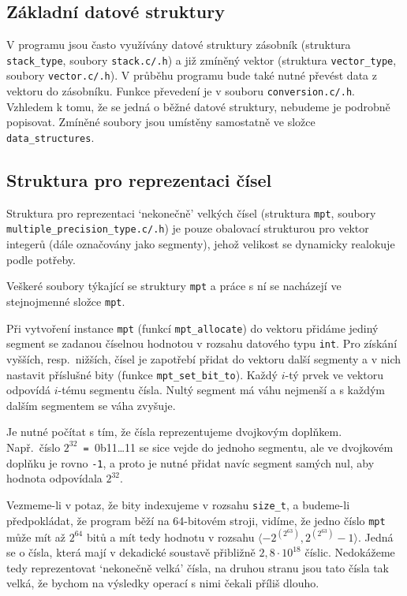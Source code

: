 \subsection{Základní datové struktury}
V programu jsou často využívány datové struktury zásobník (struktura \verb|stack_type|, soubory \verb|stack.c/.h|) a již zmíněný vektor (struktura \verb|vector_type|, soubory \verb|vector.c/.h|).
V průběhu programu bude také nutné převést data z vektoru do zásobníku. Funkce převedení je v souboru \verb|conversion.c/.h|. Vzhledem k tomu, že se jedná o běžné datové struktury, nebudeme je podrobně popisovat. Zmíněné soubory jsou umístěny samostatně ve složce \verb|data_structures|. 

\subsection{Struktura pro reprezentaci čísel}\label{subsection:mpt}
Struktura pro reprezentaci `nekonečně' velkých čísel (struktura \verb|mpt|, soubory \\ \verb|multiple_precision_type.c/.h|) je pouze obalovací strukturou pro vektor integerů (dále označovány jako segmenty), jehož velikost se dynamicky realokuje podle potřeby.

Veškeré soubory týkající se struktury \verb|mpt| a práce s ní se nacházejí ve stejnojmenné složce \verb|mpt|.

Při vytvoření instance \verb|mpt| (funkcí \verb|mpt_allocate|) do vektoru přidáme jediný segment se zadanou číselnou hodnotou v rozsahu datového typu \verb|int|. Pro získání vyšších, resp.~nižších, čísel je zapotřebí přidat do vektoru další segmenty a v nich nastavit příslušné bity (funkce \verb|mpt_set_bit_to|). Každý $i$-tý prvek ve vektoru odpovídá $i$-tému segmentu čísla. Nultý segment má váhu nejmenší a s každým dalším segmentem se váha zvyšuje.

Je nutné počítat s tím, že čísla reprezentujeme dvojkovým doplňkem. \\Např.~číslo $2^{32}$\verb| = |0b11\dots 11 se sice vejde do jednoho segmentu, ale ve dvojkovém doplňku je rovno \verb|-1|, a proto je nutné přidat navíc segment samých nul, aby hodnota odpovídala $2^{32}$.

Vezmeme-li v potaz, že bity indexujeme v rozsahu \verb|size_t|, a budeme-li předpokládat, že program běží na 64-bitovém stroji, vidíme, že jedno číslo \verb|mpt| může mít až $2^{64}$ bitů a mít tedy hodnotu v rozsahu $\langle-2^{(2^{63})}, 2^{(2^{63})}-1\rangle$. Jedná se o čísla, která mají v dekadické soustavě přibližně $2,8\cdot{}10^{18}$ číslic. Nedokážeme tedy reprezentovat `nekonečně velká' čísla, na druhou stranu jsou tato čísla tak velká, že bychom na výsledky operací s nimi čekali příliš dlouho.

